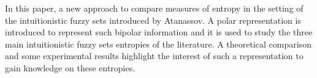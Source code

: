 
  In this paper, a new approach to compare measures of entropy in the setting of the
  intuitionistic fuzzy sets introduced by Ata\-nas\-sov.  A polar representation is
  introduced to represent such bipolar information and it is used to study the three main
  intuitionistic fuzzy sets entropies of the literature. A theoretical comparison and some
  experimental results highlight the interest of such a representation to gain knowledge
  on these entropies.


